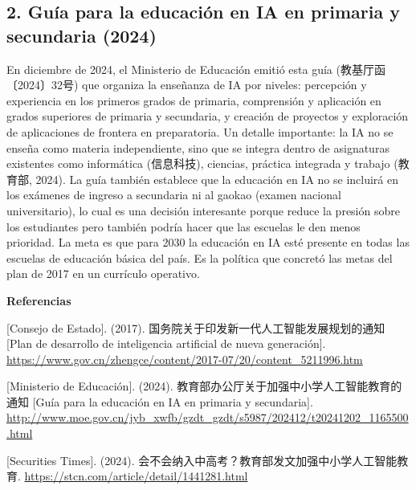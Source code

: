 \documentclass[12pt,a4paper]{article}
\newcommand{\zh}[1]{{\cjkfont #1}}
\begin{document}
\subsection*{2. Guía para la educación en IA en primaria y secundaria (2024)}

En diciembre de 2024, el Ministerio de Educación emitió esta guía (\zh{教基厅函〔2024〕32号}) que organiza la enseñanza de IA por niveles: percepción y experiencia en los primeros grados de primaria, comprensión y aplicación en grados superiores de primaria y secundaria, y creación de proyectos y exploración de aplicaciones de frontera en preparatoria. Un detalle importante: la IA no se enseña como materia independiente, sino que se integra dentro de asignaturas existentes como informática (\zh{信息科技}), ciencias, práctica integrada y trabajo (\zh{教育部}, 2024). La guía también establece que la educación en IA no se incluirá en los exámenes de ingreso a secundaria ni al gaokao (examen nacional universitario), lo cual es una decisión interesante porque reduce la presión sobre los estudiantes pero también podría hacer que las escuelas le den menos prioridad. La meta es que para 2030 la educación en IA esté presente en todas las escuelas de educación básica del país. Es la política que concretó las metas del plan de 2017 en un currículo operativo.

\newpage
\begin{center}
{\large\bfseries Referencias}
\end{center}
\vspace{0.5cm}

\noindent \zh{国务院} [Consejo de Estado]. (2017). \zh{国务院关于印发新一代人工智能发展规划的通知} [Plan de desarrollo de inteligencia artificial de nueva generación]. \url{https://www.gov.cn/zhengce/content/2017-07/20/content_5211996.htm}

\vspace{0.4cm}
\noindent \zh{教育部} [Ministerio de Educación]. (2024). \zh{教育部办公厅关于加强中小学人工智能教育的通知} [Guía para la educación en IA en primaria y secundaria]. \url{http://www.moe.gov.cn/jyb_xwfb/gzdt_gzdt/s5987/202412/t20241202_1165500.html}

\vspace{0.4cm}
\noindent \zh{证券时报} [Securities Times]. (2024). \zh{会不会纳入中高考？教育部发文加强中小学人工智能教育}. \url{https://stcn.com/article/detail/1441281.html}
\end{document}
